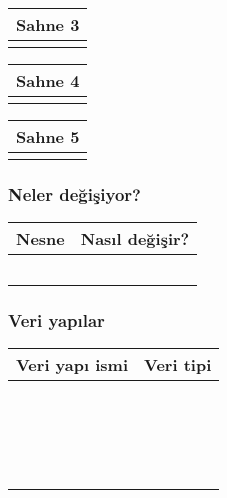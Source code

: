 \documentclass[12pt, a4paper]{article}
\begin{document}
\vspace{5ex}
\noindent
\begin{tabular}{| p{16.5cm}  |  }
\hline			
Sahne 3\\
\hline
 \\[50ex]
\hline  
\end{tabular}

\vspace{5ex}
\noindent
\begin{tabular}{| p{16.5cm}  |  }
\hline			
Sahne 4\\
\hline
 \\[50ex]
\hline  
\end{tabular}

\vspace{5ex}
\noindent
\begin{tabular}{| p{16.5cm}  |  }
\hline			
Sahne 5\\
\hline
 \\[50ex]
\hline  
\end{tabular}

\subsubsection*{Neler değişiyor?}
\begin{tabular}{| p{4cm} | p{11cm} |  }
\hline			
Nesne&Nasıl değişir?\\
\hline
& \\[6ex]
\hline  
& \\[6ex]
\hline  
& \\[6ex]
\hline  
& \\[6ex]
\hline  
& \\[6ex]
\hline  
\end{tabular}


\subsubsection*{Veri yapılar}
\begin{tabular}{| p{4cm} | p{11cm} |  }
\hline			
Veri yapı ismi&Veri tipi\\
\hline
& \\[2ex]
\hline  
& \\[2ex]
\hline  
& \\[2ex]
\hline  
& \\[2ex]
\hline  
& \\[2ex]
\hline  
& \\[2ex]
\hline  
& \\[2ex]
\hline  
& \\[2ex]
\hline  
& \\[2ex]
\hline  
& \\[2ex]
\hline  
& \\[2ex]
\hline  
& \\[2ex]
\hline  
& \\[2ex]
\hline  
& \\[2ex]
\hline  
& \\[2ex]
\hline  
& \\[2ex]
\hline  
& \\[2ex]
\hline  
& \\[2ex]
\hline  
\end{tabular}
\end{document}
